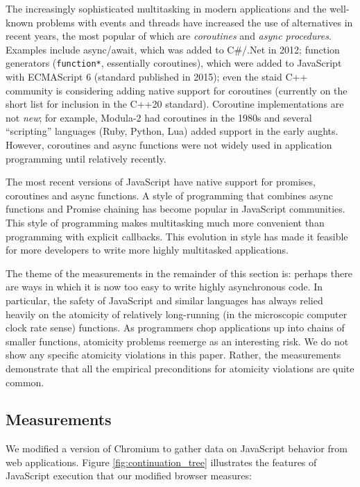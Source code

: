 \documentclass[acmsmall,anonymous,review]{acmart}\settopmatter{printfolios=true,printccs=false,printacmref=false}
\begin{document}
The increasingly sophisticated multitasking in modern applications and the well-known problems with events and threads have increased the use of alternatives in recent years, the most popular of which are \emph{coroutines} and \emph{async procedures}.
Examples include async/await, which was added to C\#/.Net in 2012; function generators (\texttt{function*}, essentially coroutines), which were added to JavaScript with ECMAScript 6 (standard published in 2015); even the staid C++ community is considering adding native support for coroutines (currently on the short list for inclusion in the C++20 standard).
Coroutine implementations are not \emph{new}; for example, Modula-2 had coroutines in the 1980s and several ``scripting'' languages (Ruby, Python, Lua) added support in the early aughts.
However, coroutines and async functions were not widely used in application programming until relatively recently.

The most recent versions of JavaScript have native support for promises, coroutines and async functions.
A style of programming that combines async functions and Promise chaining has become popular in JavaScript communities.
This style of programming makes multitasking much more convenient than programming with explicit callbacks.
This evolution in style has made it feasible for more developers to write more highly multitasked applications.

The theme of the measurements in the remainder of this section is: perhaps there are ways in which it is now too easy to write highly asynchronous code.
In particular, the safety of JavaScript and similar languages has always relied heavily on the atomicity of relatively long-running (in the microscopic computer clock rate sense) functions.
As programmers chop applications up into chains of smaller functions, atomicity problems reemerge as an interesting risk.
We do not show any specific atomicity violations in this paper.
Rather, the measurements demonstrate that all the empirical preconditions for atomicity violations are quite common.

\subsection{Measurements}

We modified a version of Chromium to gather data on JavaScript behavior from web applications.
Figure \ref{fig:continuation_tree} illustrates the features of JavaScript execution that our modified browser measures:
\end{document}
